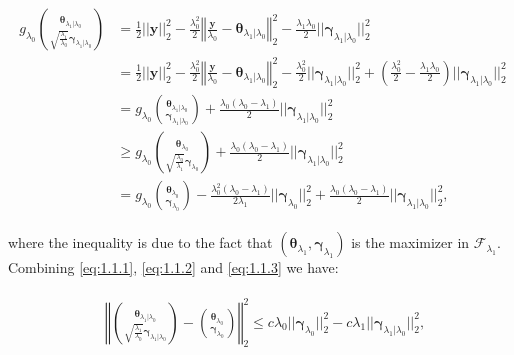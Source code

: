 \begin{gather}
    \label{eq:1.1.3}
    \begin{aligned}
        g_{\lambda_0}\binom{\boldsymbol\theta_{\lambda_1|\lambda_0}}{\sqrt{\frac{\lambda_1}{\lambda_0}}\boldsymbol\gamma_{\lambda_1|\lambda_0}}&=\frac{1}{2}||\boldsymbol y||_2^2-\frac{\lambda_0^2}{2}\left\Vert\frac{\boldsymbol y}{\lambda_0}-\boldsymbol\theta_{\lambda_1|\lambda_0}\right\Vert_2^2-\frac{\lambda_1\lambda_0}{2}||\boldsymbol\gamma_{\lambda_1|\lambda_0}||_2^2\\
        &= \frac{1}{2}||\boldsymbol y||_2^2-\frac{\lambda_0^2}{2}\left\Vert\frac{\boldsymbol y}{\lambda_0}-\boldsymbol\theta_{\lambda_1|\lambda_0}\right\Vert_2^2-\frac{\lambda_0^2}{2}||\boldsymbol\gamma_{\lambda_1|\lambda_0}||_2^2+\left(\frac{\lambda_0^2}{2}-\frac{\lambda_1\lambda_0}{2}\right)||\boldsymbol\gamma_{\lambda_1|\lambda_0}||_2^2\\
        &=g_{\lambda_0}\binom{\boldsymbol\theta_{\lambda_1|\lambda_0}}{\boldsymbol\gamma_{\lambda_1|\lambda_0}}+\frac{\lambda_0(\lambda_0-\lambda_1)}{2}||\boldsymbol\gamma_{\lambda_1|\lambda_0}||_2^2\\
        &\geq g_{\lambda_0}\binom{\boldsymbol\theta_{\lambda_0}}{\sqrt{\frac{\lambda_0}{\lambda_1}}\boldsymbol\gamma_{\lambda_0}}+\frac{\lambda_0(\lambda_0-\lambda_1)}{2}||\boldsymbol\gamma_{\lambda_1|\lambda_0}||_2^2\\
        &=g_{\lambda_0}\binom{\boldsymbol\theta_{\lambda_0}}{\boldsymbol\gamma_{\lambda_0}}-\frac{\lambda_0^2(\lambda_0-\lambda_1)}{2\lambda_1}||\boldsymbol\gamma_{\lambda_0}||_2^2+\frac{\lambda_0(\lambda_0-\lambda_1)}{2}||\boldsymbol\gamma_{\lambda_1|\lambda_0}||_2^2,
    \end{aligned}
\end{gather}

where the inequality is due to the fact that $(\boldsymbol\theta_{\lambda_1},\boldsymbol\gamma_{\lambda_1})$ is the maximizer in $\mathcal{F}_{\lambda_1}$. Combining \eqref{eq:1.1.1}, \eqref{eq:1.1.2} and \eqref{eq:1.1.3} we have:

\begin{gather}
    \begin{aligned}
        &\left\Vert\binom{\boldsymbol\theta_{\lambda_1|\lambda_0}}{\sqrt{\frac{\lambda_1}{\lambda_0}}\boldsymbol\gamma_{\lambda_1|\lambda_0}}-\binom{\boldsymbol\theta_{\lambda_0}}{\boldsymbol\gamma_{\lambda_0}}\right\Vert_2^2\leq c\lambda_0||\boldsymbol\gamma_{\lambda_0}||_2^2-c\lambda_1||\boldsymbol\gamma_{\lambda_1|\lambda_0}||_2^2,
    \end{aligned}
\end{gather}

